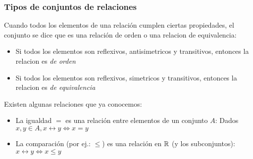 \documentclass[../teoria.root.tex]{subfiles}
\begin{document}
\subsubsection{Tipos de conjuntos de relaciones}
Cuando todos los elementos de una relación cumplen ciertas propiedades, 
el conjunto se dice que es una relación de orden o una relacion de equivalencia:
\begin{itemize}
    \item Si todos los elementos son reflexivos, antisimetricos y transitivos, entonces la relacion es \textit{de orden}
    \item Si todos los elementos son reflexivos, simetricos y transitivos, entonces la relacion es \textit{de equivalencia}
\end{itemize}

Existen algunas relaciones que ya conocemos:
\begin{itemize}
    \item La igualdad $=$ es una relación entre elementos de un conjunto $A$: Dados $x, y \in A, x \rel y \iff x = y$
    \item La comparación (por ej.: $\leq$) es una relación en $\mathbb{R}$ (y los subconjuntos): $x \rel y \iff x \leq y$
\end{itemize}
\end{document}
